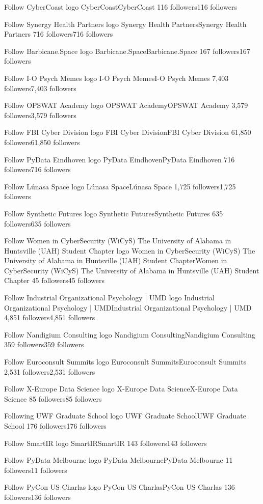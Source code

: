 Follow
CyberCoast logo
CyberCoastCyberCoast
116 followers116 followers

Follow
Synergy Health Partners logo
Synergy Health PartnersSynergy Health Partners
716 followers716 followers

Follow
Barbicane.Space logo
Barbicane.SpaceBarbicane.Space
167 followers167 followers

Follow
I-O Psych Memes logo
I-O Psych MemesI-O Psych Memes
7,403 followers7,403 followers

Follow
OPSWAT Academy logo
OPSWAT AcademyOPSWAT Academy
3,579 followers3,579 followers

Follow
FBI Cyber Division logo
FBI Cyber DivisionFBI Cyber Division
61,850 followers61,850 followers

Follow
PyData Eindhoven logo
PyData EindhovenPyData Eindhoven
716 followers716 followers

Follow
Lúnasa Space logo
Lúnasa SpaceLúnasa Space
1,725 followers1,725 followers

Follow
Synthetic Futures logo
Synthetic FuturesSynthetic Futures
635 followers635 followers

Follow
Women in CyberSecurity (WiCyS) The University of Alabama in Huntsville (UAH) Student Chapter logo
Women in CyberSecurity (WiCyS) The University of Alabama in Huntsville (UAH) Student ChapterWomen in CyberSecurity (WiCyS) The University of Alabama in Huntsville (UAH) Student Chapter
45 followers45 followers

Follow
Industrial Organizational Psychology | UMD logo
Industrial Organizational Psychology | UMDIndustrial Organizational Psychology | UMD
4,851 followers4,851 followers

Follow
Nandigium Consulting logo
Nandigium ConsultingNandigium Consulting
359 followers359 followers

Follow
Euroconsult Summits logo
Euroconsult SummitsEuroconsult Summits
2,531 followers2,531 followers

Follow
X-Europe Data Science logo
X-Europe Data ScienceX-Europe Data Science
85 followers85 followers

Following
UWF Graduate School logo
UWF Graduate SchoolUWF Graduate School
176 followers176 followers

Follow
SmartIR logo
SmartIRSmartIR
143 followers143 followers

Follow
PyData Melbourne logo
PyData MelbournePyData Melbourne
11 followers11 followers

Follow
PyCon US Charlas logo
PyCon US CharlasPyCon US Charlas
136 followers136 followers

